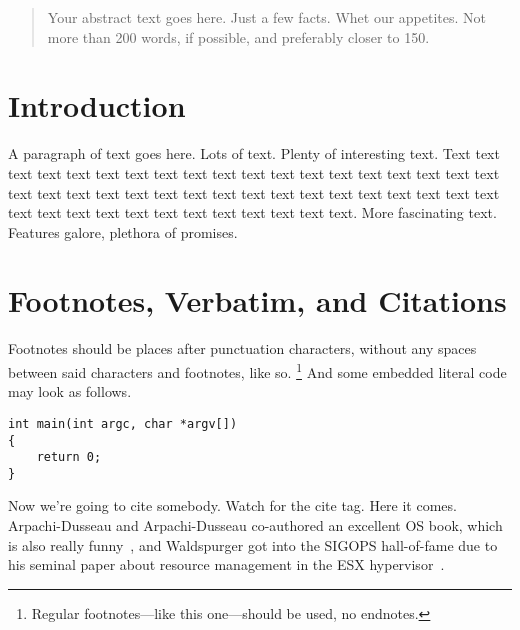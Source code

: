\maketitle

\thispagestyle{empty}

\begin{abstract}
Your abstract text goes here. Just a few facts. Whet our appetites. Not more
than 200 words, if possible, and preferably closer to 150.
\end{abstract}


\section{Introduction}

A paragraph of text goes here. Lots of text. Plenty of interesting text. Text
text text text text text text text text text text text text text text text text
text text text text text text text text text text text text text text text text
text text text text text text text text text text text text text text text. More
fascinating text. Features galore, plethora of promises.

\section{Footnotes, Verbatim, and Citations}

Footnotes should be places after punctuation characters, without any spaces
between said characters and footnotes, like so.%
\footnote{Regular footnotes---like this one---should be used, no endnotes.} And
some embedded literal code may look as follows.

\begin{verbatim}
int main(int argc, char *argv[]) 
{
    return 0;
}
\end{verbatim}

Now we're going to cite somebody. Watch for the cite tag. Here it comes.
Arpachi-Dusseau and Arpachi-Dusseau co-authored an excellent OS book, which is
also really funny~\cite{arpachiDusseau18:osbook}, and Waldspurger got into the
SIGOPS hall-of-fame due to his seminal paper about resource management in the
ESX hypervisor~\cite{waldspurger02}.

